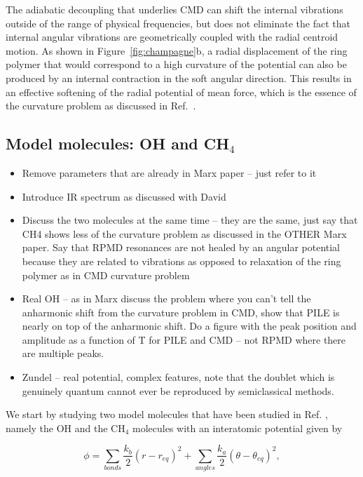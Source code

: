 \documentclass[aps,prb,superscriptaddress,amsmath,amssymb,showpacs,twocolumn]{revtex4}
\begin{document}
The adiabatic decoupling that underlies CMD can shift the internal vibrations outside of the range of 
physical frequencies, but does not eliminate the fact that internal angular vibrations are geometrically 
coupled with the radial centroid motion. 
As shown in Figure~\ref{fig:champagne}b, a radial displacement of the ring polymer that would correspond to a high 
curvature of the potential can also be produced by an internal contraction in the soft angular
direction. This results in an effective softening of the radial potential of mean force, which is the essence
of the curvature problem as discussed in Ref.~\cite{witt+09jcp}.


\subsection{Model molecules: OH and CH$_4$}

\begin{itemize}
\item Remove parameters that are already in Marx paper -- just refer to it
\item Introduce IR spectrum as discussed with David
\item Discuss the two molecules at the same time -- they are the same, just say
that CH4 shows less of the curvature problem as discussed in the OTHER Marx paper. 
Say that RPMD resonances are not healed by an angular potential because they are related
to vibrations as opposed to relaxation of the ring polymer as in CMD curvature problem
\item Real OH -- as in Marx discuss the problem where you can't tell the anharmonic shift from
the curvature problem in CMD, show that PILE is nearly on top of the anharmonic shift. Do a figure with the peak
position and amplitude as a function of T for PILE and CMD -- not RPMD where there are multiple peaks.
\item Zundel -- real potential, complex features, note that the doublet which is genuinely quantum 
cannot ever be reproduced by semiclassical methods.
\end{itemize}



We start by studying two model molecules that have been studied in Ref. \cite{witt+09jcp},
namely the OH and the CH$_4$ molecules with an interatomic potential given by

\begin{equation}
\phi=\sum_{bonds} \frac{k_b}{2} (r-r_{eq})^2 + \sum_{angles} \frac{k_a}{2}(\theta - \theta_{eq})^2,
\end{equation}
\end{document}
